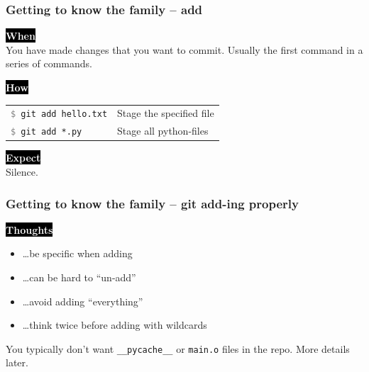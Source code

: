 \documentclass{beamer}
\newcommand{\keyword}[1]{\hspace{-1.0em}\colorbox{black}{\textcolor{white}{\textbf{#1}\vphantom{Ep}}}\vspace{0.2em}} %
\newcommand{\command}[1]{\texttt{\textcolor{gray}{\$} {#1}}}
\begin{document}
\begin{frame}
  \frametitle{Getting to know the family -- add}
  \keyword{When}\\
    You have made changes that you want to commit.
    Usually the first command in a series of commands.
  \vspace{0.5em}

  \keyword{How}\\
  \hspace{-0.95em}
  \begin{tabular}{ll}
    \command{git add hello.txt} & Stage the specified file \\
    \command{git add *.py} & Stage all python-files \\
  \end{tabular}
  \vspace{0.5em}

  \keyword{Expect}\\
  Silence.
\end{frame}

\begin{frame}
  \frametitle{Getting to know the family -- git add-ing properly}

  \keyword{Thoughts}
  \begin{itemize}[<+->]
    \item \dots be specific when adding
    \item \dots can be hard to ``un-add''
    \item \dots avoid adding ``everything''
    \item \dots think twice before adding with wildcards
  \end{itemize}

  \pause
  \vspace{1em}

  You typically don't want \texttt{\_\_pycache\_\_} or \texttt{main.o} files in
  the repo. More details later.

\end{frame}
\end{document}

